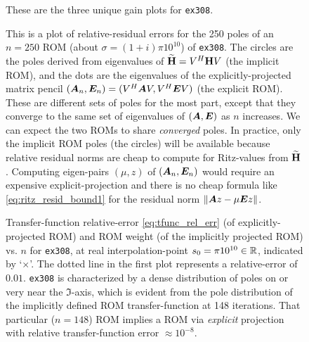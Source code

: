 \begin{figure}
\caption{\label{fig:ex308FR_all} These are the three unique gain plots for \texttt{ex308}. }
\end{figure}


\begin{figure}
\caption{\label{fig:308polesn250} This is a plot of relative-residual errors for the 250 poles of an $n=250$ ROM (about $\sigma=(1+i)\pi 10^{10}$) of \texttt{ex308}.  The circles are the poles derived from eigenvalues of $\widetilde{\textbf{\textup{H}}}=V^H\textbf{\textup{H}} V$ (the implicit ROM), and the dots are the eigenvalues of the explicitly-projected matrix pencil $(\bm{A}_n,\bm{E}_n) = (V^H\bm{A} V, V^H\bm{E} V)$ (the explicit ROM).   These are different sets of poles for the most part, except that they converge to the same set of eigenvalues of $(\bm{A},\bm{E})$ as $n$ increases.   We can expect the two ROMs to share \emph{converged} poles.  In practice, only the implicit ROM poles (the circles) will be available because relative residual norms are cheap to compute for Ritz-values from $\widetilde{\textbf{\textup{H}}}$.   Computing eigen-pairs $(\mu,z)$ of $(\bm{A}_n,\bm{E}_n)$ would require an expensive explicit-projection and there is no cheap formula like     \eqref{eq:ritz_resid_bound1} for the residual norm $\| \bm{A} z - \mu \bm{E} z \|$. }
\end{figure}
\smallskip



\begin{figure}[htbp]
\centering
{}

\caption{\label{fig:308benchmark1} Transfer-function relative-error \eqref{eq:tfunc_rel_err} (of explicitly-projected ROM) and ROM weight (of the implicitly projected ROM) vs. $n$ for \texttt{ex308}, at real interpolation-point $s_0 = \pi 10^{10}\in\mathbb{R}$, indicated by `$\times$'.     The dotted line in the first plot  represents a relative-error of $0.01$.   \texttt{ex308} is characterized by a dense distribution of poles on or very near the $\Im$-axis, which is evident from the pole distribution of the implicitly defined ROM transfer-function at 148 iterations.  That particular ($n=148$) ROM implies a ROM via \emph{explicit} projection with relative transfer-function error $\approx 10^{-8}$. }
\end{figure}

